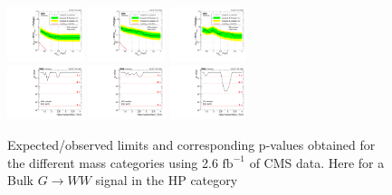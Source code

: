 \begin{figure}[h!]
\centering
\includegraphics[width=0.20\textwidth]{figures/analysis/search1/AN-15-211/limits/brazilianFlag_BulkWW_WWHP_13TeV_wPDF.pdf}
\includegraphics[width=0.20\textwidth]{figures/analysis/search1/AN-15-211/limits/brazilianFlag_BulkWW_WZHP_13TeV_wPDF.pdf}
\includegraphics[width=0.20\textwidth]{figures/analysis/search1/AN-15-211/limits/brazilianFlag_BulkWW_ZZHP_13TeV_wPDF.pdf}\\
\includegraphics[width=0.20\textwidth]{figures/analysis/search1/AN-15-211/pvalues/pvalue_BulkWWinWW_high_purity.pdf}
\includegraphics[width=0.20\textwidth]{figures/analysis/search1/AN-15-211/pvalues/pvalue_BulkWWinWZ_high_purity.pdf}
\includegraphics[width=0.20\textwidth]{figures/analysis/search1/AN-15-211/pvalues/pvalue_BulkWWinZZ_high_purity.pdf}
\caption{Expected/observed limits and corresponding p-values obtained for the different mass categories using 2.6 $\textrm{fb}^{-1}$ of CMS data. Here for a Bulk $G\rightarrow WW$ signal in the HP category}
\label{fig:searchI:Limits_HPBulkWW}
\end{figure}

